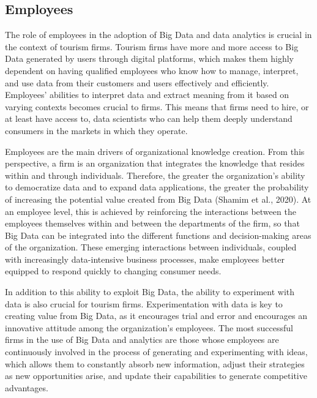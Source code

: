 \documentclass[
  letterpaper,
  DIV=11,
  numbers=noendperiod]{scrreprt}
\begin{document}
\hypertarget{employees}{%
\subsection{Employees}\label{employees}}

The role of employees in the adoption of Big Data and data analytics is
crucial in the context of tourism firms. Tourism firms have more and
more access to Big Data generated by users through digital platforms,
which makes them highly dependent on having qualified employees who know
how to manage, interpret, and use data from their customers and users
effectively and efficiently. Employees' abilities to interpret data and
extract meaning from it based on varying contexts becomes crucial to
firms. This means that firms need to hire, or at least have access to,
data scientists who can help them deeply understand consumers in the
markets in which they operate.

Employees are the main drivers of organizational knowledge creation.
From this perspective, a firm is an organization that integrates the
knowledge that resides within and through individuals. Therefore, the
greater the organization's ability to democratize data and to expand
data applications, the greater the probability of increasing the
potential value created from Big Data (Shamim et al., 2020). At an
employee level, this is achieved by reinforcing the interactions between
the employees themselves within and between the departments of the firm,
so that Big Data can be integrated into the different functions and
decision-making areas of the organization. These emerging interactions
between individuals, coupled with increasingly data-intensive business
processes, make employees better equipped to respond quickly to changing
consumer needs.

In addition to this ability to exploit Big Data, the ability to
experiment with data is also crucial for tourism firms. Experimentation
with data is key to creating value from Big Data, as it encourages trial
and error and encourages an innovative attitude among the organization's
employees. The most successful firms in the use of Big Data and
analytics are those whose employees are continuously involved in the
process of generating and experimenting with ideas, which allows them to
constantly absorb new information, adjust their strategies as new
opportunities arise, and update their capabilities to generate
competitive advantages.
\end{document}
